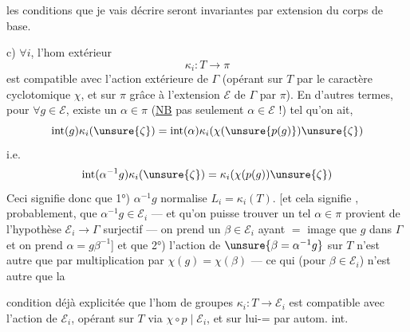 
les conditions que je vais décrire seront invariantes par extension du corps de base.


c) \(\forall i\), l'hom extérieur
\[
\kappa_i:T\longrightarrow\pi
\]
est compatible avec l'action extérieure de \(\Gamma\) (opérant sur \(T\) par le
caractère cyclotomique \(\chi\), et sur \(\pi\) grâce à l'extension \(\mathcal E\)
de \(\Gamma\) par \(\pi\)). En d'autres termes, pour \(\forall g\in\mathcal E\),
existe un \uline{\(\alpha\in\pi\)} (\uline{NB} pas seulement
\(\alpha\in\mathcal E\) !) tel qu'on ait,
\[
\operatorname{int}(g)\kappa_i(\unsure{\zeta})
=\operatorname{int}(\alpha)\kappa_i(\chi(\unsure{p(g)})\unsure{\zeta})
\]
i.e.
\[
\operatorname{int}(\alpha^{-1}g)\kappa_i(\unsure{\zeta})
=\kappa_i(\chi(p(g))\unsure{\zeta})
\]
Ceci signifie donc que 1°) \(\alpha^{-1}g\) normalise \(L_i=\kappa_i(T)\).
[et cela signifie \unsure{\(=\)}, probablement, que \(\alpha^{-1}g\in\mathcal E_i\)
--- et qu'on puisse trouver un tel \(\alpha\in\pi\)
 provient de l'hypothèse
\(\mathcal E_i\to\Gamma\) surjectif --- on prend un \(\beta\in\mathcal E_i\)
 ayant \(=\) image que \(g\) dans \(\Gamma\)
et on prend \(\alpha=g\beta^{-1}\)] et que 2°) l'action  de
\(\unsure{\beta=\alpha^{-1}g}\) sur \(T\) n'est autre que par multiplication
par \(\chi(g)=\chi(\beta)\) --- ce qui (pour \(\beta\in\mathcal E_i\)) n'est autre que la



condition déjà explicitée que l'hom de groupes \(\kappa_i:T\to\mathcal E_i\)
est compatible avec l'action de \(\mathcal E_i\), opérant sur \(T\) via
\(\chi\circ p\mid\mathcal E_i\), et sur lui-= par autom. int.

